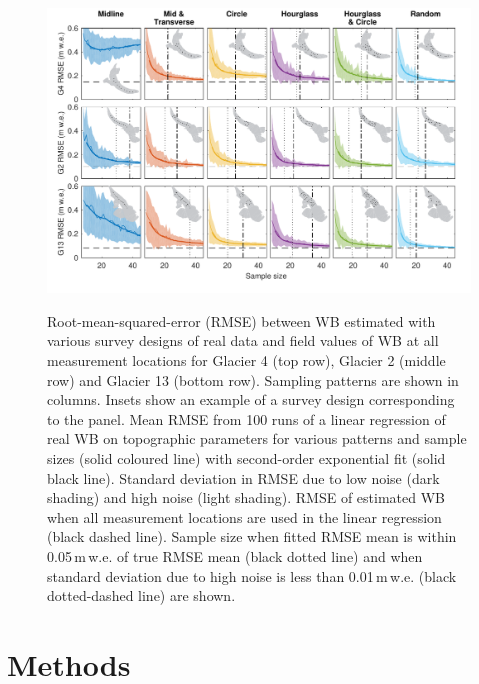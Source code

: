 \documentclass{article}
\begin{document}
\begin{figure}
	\centering
	\includegraphics[width =\textwidth]{DataObsWB.pdf}\\
	\caption{Root-mean-squared-error (RMSE) between WB estimated with various survey designs of real data and field values of WB at all measurement locations for Glacier 4 (top row), Glacier 2 (middle row) and Glacier 13 (bottom row). Sampling patterns are shown in columns. Insets show an example of a survey design corresponding to the panel. Mean RMSE from 100 runs of a linear regression of real WB on topographic parameters for various patterns and sample sizes (solid coloured line) with second-order exponential fit (solid black line). Standard deviation in RMSE due to low noise (dark shading) and high noise (light shading). RMSE of estimated WB when all measurement locations are used in the linear regression (black dashed line). Sample size when fitted RMSE mean is within 0.05\,m\,w.e. of true RMSE mean (black dotted line) and when standard deviation due to high noise is less than 0.01\,m\,w.e. (black dotted-dashed line) are shown.}
	\label{fig:RealObsWB}
\end{figure}


\section{Methods}
\end{document}
